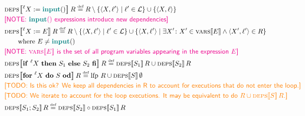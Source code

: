 \documentclass{article}
\newcommand{\defined}{\ensuremath{\stackrel{\mbox{\tiny def}}{=}}\xspace} %
\newcommand{\ipt}{\ensuremath{\mathsf{\mathbf{\color{teal}input}}()}\xspace} %
\newcommand{\tuple}[2]{\ensuremath{\langle #1, #2 \rangle}\xspace} %
\newcommand{\lfp}{\ensuremath{\mathrm{lfp}}\xspace} %
\newcommand{\labels}{\ensuremath{\mathcal{L}}\xspace} %
\newcommand{\semantics}[1]{\ensuremath{\left\llbracket #1 \right\rrbracket}\xspace} %
\newcommand{\deps}[1]{\ensuremath{\textsc{deps}\!\semantics{#1}}\xspace} %
\newcommand{\ids}[1]{\ensuremath{\textsc{vars}\!\semantics{#1}}\xspace} %
\newcommand{\irem}[3]{{\noindent\textcolor{#1}{\textsf{[#2: 
#3]}}}}
\newcommand{\todo}[1]{\irem{orange}{TODO}{#1}}
\newcommand{\note}[1]{\irem{magenta}{NOTE}{#1}}
\begin{document}
	\begin{align*}
	&\deps{^\ell{}X := \ipt}R \defined R \setminus \{ \tuple{X}{\ell{}'} \mid \ell{}' \in \labels \} \cup \{ \tuple{X}{\ell{}} \} 
	\\
	&\mbox{\note{\ipt expressions introduce new dependencies}} \\
	&\deps{^\ell{}X := E}R \defined R \setminus \{ \tuple{X}{\ell{}'} \mid \ell{}' \in \labels \} \cup \{ \tuple{X}{\ell{}'} \mid \exists X'\colon X' \in \ids{E} \land \tuple{X'}{\ell{}'} \in R \} \\
	&\qquad\mbox{where $E \not= \ipt$} \\
	&\mbox{\note{\ids{E} is the set of all program variables appearing in the expression $E$}} \\
%
	&\deps{\mathsf{\mathbf{if}}~^\ell{}X~\mathsf{\mathbf{then}}~S_1~\mathsf{\mathbf{else}}~S_2~\mathsf{\mathbf{fi}}}R
	 \defined \deps{S_1}R \cup \deps{S_2}R \\ 
%
&\deps{\mathsf{\mathbf{for}}~^\ell{}X~\mathsf{\mathbf{do}}~S~\mathsf{\mathbf{od}}}R
\defined \lfp~R \cup \deps{S}\emptyset  \\
&\todo{Is this ok? We keep all dependencies in R to account for executions that do not enter the loop.} \\
&\todo{We iterate to account for the loop executions. It may be equivalent to do $R \cup \deps{S}R$.} \\
%
&\deps{S_1; S_2}R \defined \deps{S_2} \circ 
\deps{S_1}R
	\end{align*}


%
%
\end{document}
